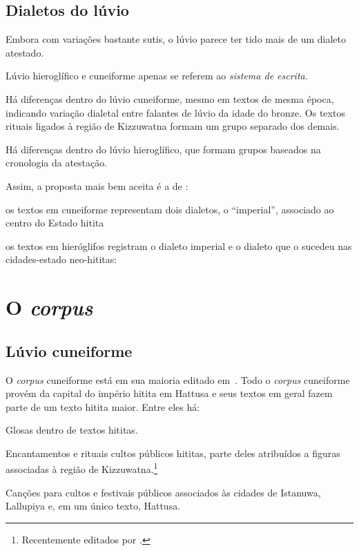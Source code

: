 \documentclass[article]{lúvio}
\begin{document}
\section{Dialetos do lúvio}

Embora com variações bastante sutis, o lúvio parece ter tido mais de um dialeto
atestado.

\begin{compactitem}
	\item Lúvio hieroglífico e cuneiforme apenas se referem ao \emph{sistema de escrita}.
	\item Há diferenças dentro do lúvio cuneiforme, mesmo em textos de mesma
	época, indicando variação dialetal entre falantes de lúvio da idade do
	bronze. Os textos rituais ligados à região de Kizzuwatna formam um grupo separado
	dos demais.
	\item Há diferenças dentro do lúvio hieroglífico, que formam grupos baseados
	na cronologia da atestação.
	\item Assim, a proposta mais bem aceita é a de \textcite{Yakubovich2010}:
	\begin{compactitem}
		\item os textos em cuneiforme representam dois
		dialetos, o ``imperial'', associado ao centro do Estado hitita
		\item os textos em hieróglifos registram o dialeto imperial e o dialeto que o
		sucedeu nas cidades\hyp{}estado neo\hyp{}hititas:
	\end{compactitem}
	\begin{center}
	\end{center}
\end{compactitem}

\chapter{O \emph{corpus}}

\section{Lúvio cuneiforme}

O \emph{corpus} cuneiforme está em sua maioria editado em~\textcite{Starke1985}.
Todo o \emph{corpus} cuneiforme provém da capital do império hitita em Hattusa e
seus textos em geral fazem parte de um texto hitita maior. Entre eles há:
\begin{compactitem}
	\item Glosas dentro de textos hititas.
	\item Encantamentos e rituais cultos públicos hititas, parte deles atribuídos
	a figuras associadas à região de
	Kizzuwatna.\footnote{Recentemente editados por \textcite{YakubovichMouton2023}.}
	\item Canções para cultos e festivais públicos associados às cidades de
	Istanuwa, Lallupiya e, em um único texto, Hattusa.
\end{compactitem}
\end{document}
